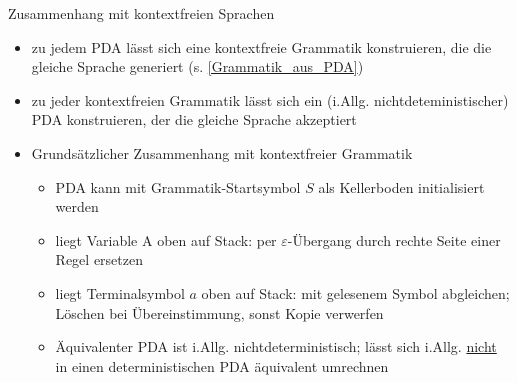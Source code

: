 \begin{frame}{Zusammenhang mit kontextfreien Sprachen}
	\begin{itemize}
		\item zu jedem PDA lässt sich eine kontextfreie Grammatik konstruieren, die die gleiche Sprache generiert (s. \ref{Grammatik_aus_PDA})
		\item zu jeder kontextfreien Grammatik lässt sich ein (i.Allg. nichtdeteministischer) PDA konstruieren, der die gleiche Sprache akzeptiert
		\item Grundsätzlicher Zusammenhang mit kontextfreier Grammatik
		\begin{itemize}
			\item PDA kann mit Grammatik-Startsymbol $S$ als Kellerboden initialisiert werden
			\item liegt Variable A oben auf Stack: per $\varepsilon$-Übergang durch rechte Seite einer Regel ersetzen
			\item liegt Terminalsymbol $a$ oben auf Stack: mit gelesenem Symbol abgleichen; Löschen bei Übereinstimmung, sonst Kopie verwerfen
			\item Äquivalenter PDA ist i.Allg. nichtdeterministisch; lässt sich i.Allg. \underline{nicht} in einen deterministischen PDA äquivalent umrechnen
		\end{itemize}
	\end{itemize}
\end{frame}

